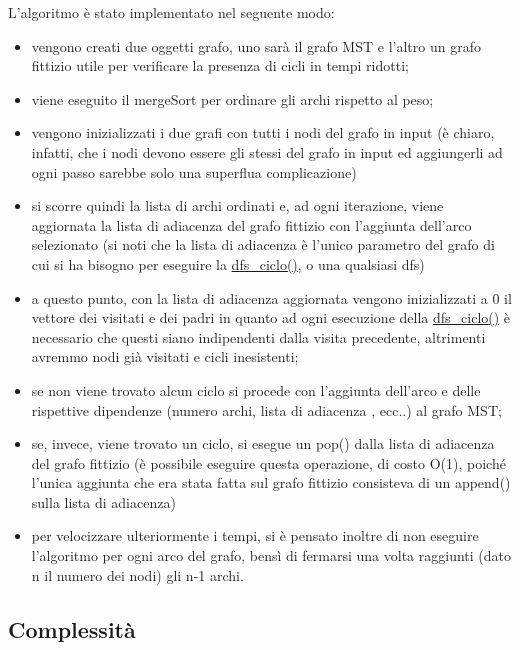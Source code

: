 L'algoritmo è stato implementato nel seguente modo:
\begin{itemize}
    
    \item vengono creati due oggetti grafo, uno sarà il grafo MST e l'altro un grafo fittizio utile per verificare la presenza di cicli in tempi ridotti;
    
    \item viene eseguito il mergeSort per ordinare gli archi rispetto al peso;
    
    \item vengono inizializzati i due grafi con tutti i nodi del grafo in input (è chiaro, infatti, che i nodi devono essere gli stessi del grafo in input ed aggiungerli ad ogni passo sarebbe solo una superflua complicazione)
    
    \item si scorre quindi la lista di archi ordinati e, ad ogni iterazione, viene aggiornata la lista di adiacenza del grafo fittizio con l'aggiunta dell'arco selezionato (si noti che la lista di adiacenza è l'unico parametro del grafo di cui si ha bisogno per eseguire la \hyperlink{dfsciclo}{dfs\_ciclo()}, o una qualsiasi dfs)
    
    \item a questo punto, con la lista di adiacenza aggiornata vengono inizializzati a 0 il vettore dei visitati e dei padri in quanto ad ogni esecuzione della \hyperlink{dfsciclo}{dfs\_ciclo()} è necessario che questi siano indipendenti dalla visita precedente, altrimenti avremmo nodi già visitati e cicli inesistenti;
    
    \item se non viene trovato alcun ciclo si procede con l'aggiunta dell'arco e delle rispettive dipendenze (numero archi, lista di adiacenza , ecc..) al grafo MST;
    
    \item se, invece, viene trovato un ciclo, si esegue un pop() dalla lista di adiacenza del grafo fittizio (è possibile eseguire questa operazione, di costo O(1), poiché l'unica aggiunta che era stata fatta sul grafo fittizio consisteva di un append() sulla lista di adiacenza)
    
    \item per velocizzare ulteriormente i tempi, si è pensato inoltre di non eseguire l'algoritmo per ogni arco del grafo, bensì di fermarsi una volta raggiunti (dato n il numero dei nodi) gli n-1 archi.
    
\end{itemize}

\subsection{Complessità}
\label{complessità}